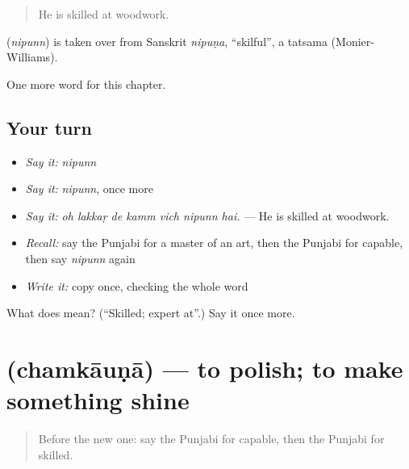 \begin{quote}
He is skilled at woodwork.
\end{quote}

\begin{cousinweb}
\textbf{} (\emph{nipunn}) is taken over from Sanskrit \emph{nipuṇa}, \textquotedblleft{}skilful\textquotedblright{}, a tatsama (Monier-Williams).
\end{cousinweb}

\begin{grammarlens}[title={What you've built}]
One more word for this chapter.
\end{grammarlens}

\subsection*{Your turn}
\begin{itemize}
\raggedright
  \item \emph{Say it:} \emph{nipunn}
  \item \emph{Say it:} \emph{nipunn}, once more
  \item \emph{Say it:} \emph{oh lakkaṛ de kamm vich nipunn hai.} — He is skilled at woodwork.
  \item \emph{Recall:} say the Punjabi for a master of an art, then the Punjabi for capable, then say \emph{nipunn} again
  \item \emph{Write it:} copy \textbf{} once, checking the whole word
\end{itemize}

\begin{tcolorbox}[breakable,colback=teal!4,colframe=teal!35!black,title={Before you move on}]
What does  mean? (\textquotedblleft{}Skilled; expert at\textquotedblright{}.) Say it once more.
\end{tcolorbox}
\section[\texorpdfstring{\pa{ਚਮਕਾਉਣਾ} (chamkāuṇā)}{ਚਮਕਾਉਣਾ (chamkāuṇā)}]{ (chamkāuṇā) — to polish; to make something shine}

\label{lesson:PA-C362-chamkauna}



\begin{quote}
Before the new one: say the Punjabi for capable, then the Punjabi for skilled.
\end{quote}

